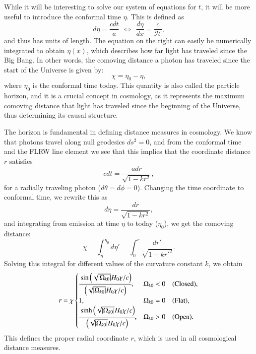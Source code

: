 \documentclass{aa}
\begin{document}
While it will be interesting to solve our system of equations for $t$, it will be more useful to introduce the conformal time $\eta$. This is defined as
\begin{equation}
d\eta = \frac{cdt}{a} \hspace{5pt}\Leftrightarrow\hspace{5pt}\frac{d\eta}{dx} = \frac{c}{\mathcal{H}},
\end{equation}
and thus has units of length. The equation on the right can easily be numerically integrated to obtain $\eta(x)$, which describes how far light has traveled since the Big Bang. In other words, the comoving distance a photon has traveled since the start of the Universe is given by:
\begin{equation}
\chi = \eta_0 - \eta,
\end{equation}
where $\eta_0$ is the conformal time today. This quantity is also called the particle horizon, and it is a crucial concept in cosmology, as it represents the maximum comoving distance that light has traveled since the beginning of the Universe, thus determining its causal structure. 

The horizon is fundamental in defining distance measures in cosmology. We know that photons travel along null geodesics $ds^2 = 0$, and from the conformal time and the FLRW line element we see that this implies that the coordinate distance $r$ satisfies
\begin{equation}
  c dt = \frac{adr}{\sqrt{1 - k r^2}},
\end{equation}
for a radially traveling photon ($d\theta = d\phi = 0$). Changing the time coordinate to conformal time, we rewrite this as
\begin{equation}
  d\eta = \frac{dr}{\sqrt{1 - k r^2}},
\end{equation}
and integrating from emission at time $\eta$ to today ($\eta_0$), we get the comoving distance:
\begin{equation}
  \chi = \int_{\eta}^{\eta_0}  d\eta' = \int_{0}^{r} \frac{dr'}{\sqrt{1 - k r'^2}}.
\end{equation}
Solving this integral for different values of the curvature constant $k$, we obtain
\begin{equation}
  r = 
  \chi\begin{cases}
  \cfrac{\sin\left(\sqrt{|\Omega_{k0}|} H_0 \chi / c\right)}{\left(\sqrt{|\Omega_{k0}|} H_0 \chi / c\right)}, & \Omega_{k0} < 0 \quad \text{(Closed)}, \\
1, & \Omega_{k0} = 0 \quad \text{(Flat)}, \\
\cfrac{\sinh\left(\sqrt{|\Omega_{k0}|} H_0 \chi / c\right)}{\left(\sqrt{|\Omega_{k0}|} H_0 \chi / c\right)}, & \Omega_{k0} > 0 \quad \text{(Open)}.
\end{cases}
\end{equation}
This defines the proper radial coordinate $r$, which is used in all cosmological distance measures. 
\end{document}
